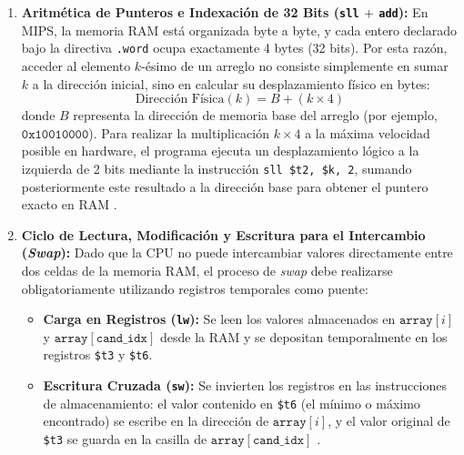 \documentclass[12pt,a4paper]{article}
\begin{document}
\begin{enumerate}[leftmargin=*]
    \item \textbf{Aritmética de Punteros e Indexación de 32 Bits (\texttt{sll} $+$ \texttt{add}):}
    En MIPS, la memoria RAM está organizada byte a byte, y cada entero declarado bajo la directiva \texttt{.word} ocupa exactamente 4 bytes (32 bits). Por esta razón, acceder al elemento $k$-ésimo de un arreglo no consiste simplemente en sumar $k$ a la dirección inicial, sino en calcular su desplazamiento físico en bytes:
    $$\text{Dirección Física}(k) = B + (k \times 4)$$
    donde $B$ representa la dirección de memoria base del arreglo (por ejemplo, $\mathtt{0x10010000}$). Para realizar la multiplicación $k \times 4$ a la máxima velocidad posible en hardware, el programa ejecuta un desplazamiento lógico a la izquierda de 2 bits mediante la instrucción \texttt{sll \$t2, \$k, 2}, sumando posteriormente este resultado a la dirección base para obtener el puntero exacto en RAM \cite{patterson}.

    \item \textbf{Ciclo de Lectura, Modificación y Escritura para el Intercambio (\textit{Swap}):}
    Dado que la CPU no puede intercambiar valores directamente entre dos celdas de la memoria RAM, el proceso de \textit{swap} debe realizarse obligatoriamente utilizando registros temporales como puente:
    \begin{itemize}
        \item \textbf{Carga en Registros (\texttt{lw}):} Se leen los valores almacenados en $\mathtt{array}[i]$ y $\mathtt{array}[\mathtt{cand\_idx}]$ desde la RAM y se depositan temporalmente en los registros \texttt{\$t3} y \texttt{\$t6}.
        \item \textbf{Escritura Cruzada (\texttt{sw}):} Se invierten los registros en las instrucciones de almacenamiento: el valor contenido en \texttt{\$t6} (el mínimo o máximo encontrado) se escribe en la dirección de $\mathtt{array}[i]$, y el valor original de \texttt{\$t3} se guarda en la casilla de $\mathtt{array}[\mathtt{cand\_idx}]$ \cite{patterson}.
    \end{itemize}


\end{enumerate}
\end{document}

